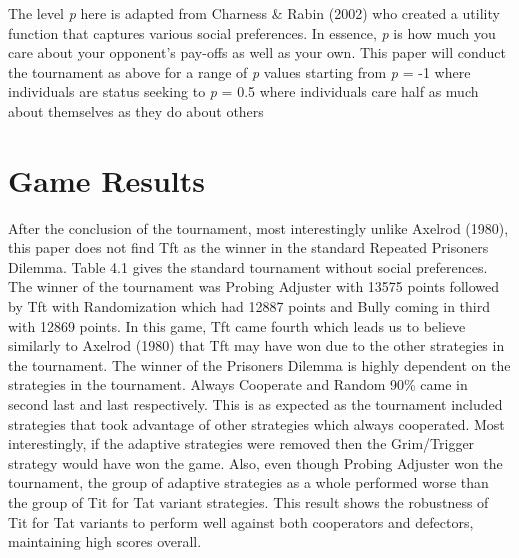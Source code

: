 \documentclass[11pt,preprint]{elsarticle}
\numberwithin{equation}{section}
\numberwithin{figure}{section}
\numberwithin{table}{section}
\begin{document}
The level \emph{p} here is adapted from Charness \& Rabin (2002) who
created a utility function that captures various social preferences. In
essence, \emph{p} is how much you care about your opponent's pay-offs as
well as your own. This paper will conduct the tournament as above for a
range of \emph{p} values starting from \emph{p} = -1 where individuals
are status seeking to \emph{p} = 0.5 where individuals care half as much
about themselves as they do about others

\section{Game Results}\label{game-results}

After the conclusion of the tournament, most interestingly unlike
Axelrod (1980), this paper does not find Tft as the winner in the
standard Repeated Prisoners Dilemma. Table 4.1 gives the standard
tournament without social preferences. The winner of the tournament was
Probing Adjuster with 13575 points followed by Tft with Randomization
which had 12887 points and Bully coming in third with 12869 points. In
this game, Tft came fourth which leads us to believe similarly to
Axelrod (1980) that Tft may have won due to the other strategies in the
tournament. The winner of the Prisoners Dilemma is highly dependent on
the strategies in the tournament. Always Cooperate and Random 90\% came
in second last and last respectively. This is as expected as the
tournament included strategies that took advantage of other strategies
which always cooperated. Most interestingly, if the adaptive strategies
were removed then the Grim/Trigger strategy would have won the game.
Also, even though Probing Adjuster won the tournament, the group of
adaptive strategies as a whole performed worse than the group of Tit for
Tat variant strategies. This result shows the robustness of Tit for Tat
variants to perform well against both cooperators and defectors,
maintaining high scores overall.

\newpage
\end{document}
